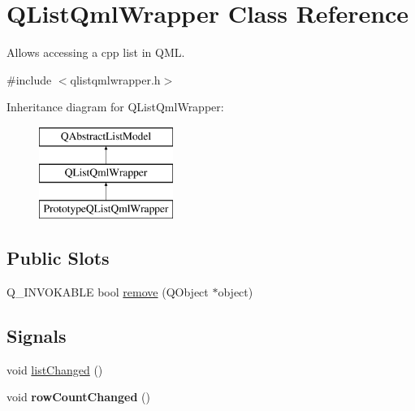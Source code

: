 \hypertarget{classQListQmlWrapper}{\section{Q\-List\-Qml\-Wrapper Class Reference}
\label{classQListQmlWrapper}
}


Allows accessing a cpp list in Q\-M\-L.  




{\ttfamily \#include $<$qlistqmlwrapper.\-h$>$}

Inheritance diagram for Q\-List\-Qml\-Wrapper\-:\begin{figure}[H]
\begin{center}
\leavevmode
\includegraphics[height=3.000000cm]{classQListQmlWrapper}
\end{center}
\end{figure}
\subsection*{Public Slots}
\begin{DoxyCompactItemize}
\item 
Q\-\_\-\-I\-N\-V\-O\-K\-A\-B\-L\-E bool \hyperlink{classQListQmlWrapper_a08ee51fb27c3c6e6c21685cec176dfe0}{remove} (Q\-Object $\ast$object)
\end{DoxyCompactItemize}
\subsection*{Signals}
\begin{DoxyCompactItemize}
\item 
void \hyperlink{classQListQmlWrapper_a098f245657e03039eb01ef586dba9b5e}{list\-Changed} ()
\item 
\hypertarget{classQListQmlWrapper_a926184c29000446a6f4301a5fc57de4e}{void {\bfseries row\-Count\-Changed} ()}\label{classQListQmlWrapper_a926184c29000446a6f4301a5fc57de4e}

\end{DoxyCompactItemize}
